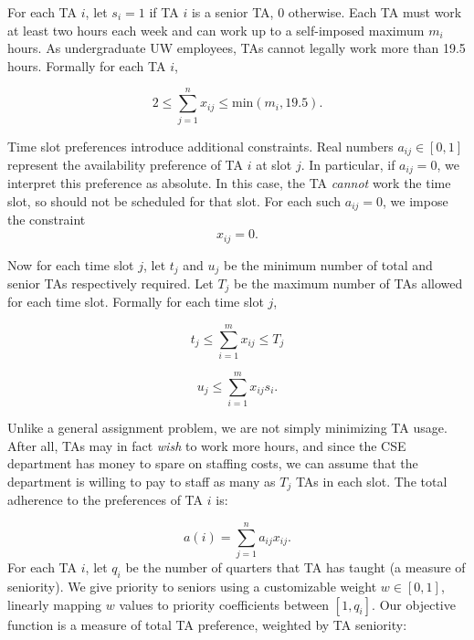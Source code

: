 \documentclass{article}
\begin{document}
\begin{multicols}{2}
For each TA $i$, let $s_i = 1$ if TA $i$ is a senior TA, 0 otherwise. Each TA must work at least two hours each week and can work up to a self-imposed maximum $m_i$ hours. As undergraduate UW employees, TAs cannot legally work more than 19.5 hours. Formally for each TA $i$,

\begin{equation}
2 \leq \sum_{j=1}^{n}x_{ij} \leq \textrm{min}(m_i, 19.5).
\end{equation}

Time slot preferences introduce additional constraints. Real numbers $a_{ij} \in [0,1]$ represent the availability preference of TA $i$ at slot $j$. In particular, if $a_{ij} = 0$, we interpret this preference as absolute. In this case, the TA \textit{cannot} work the time slot, so should not be scheduled for that slot. For each such $a_{ij} = 0$, we impose the constraint
\begin{equation}
x_{ij} = 0.
\end{equation}

Now for each time slot $j$, let $t_j$ and $u_j$ be the minimum number of total and senior TAs respectively required. Let $T_j$ be the maximum number of TAs allowed for each time slot. Formally for each time slot $j$,

\begin{equation}
t_j \leq \sum_{i=1}^{m}x_{ij} \leq T_j
\end{equation}

\begin{equation}
u_j \leq \sum_{i=1}^{m}x_{ij}s_i.
\end{equation}

Unlike a general assignment problem, we are not simply minimizing TA usage. After all, TAs may in fact \textit{wish} to work more hours, and since the CSE department has money to spare on staffing costs, we can assume that the department is willing to pay to staff as many as $T_j$ TAs in each slot. The total adherence to the preferences of TA $i$ is:

\begin{equation}
a(i) = \sum_{j=1}^na_{ij}x_{ij}.
\end{equation}
For each TA $i$, let $q_i$ be the number of quarters that TA has taught (a measure of seniority). We give priority to seniors using a customizable weight $w \in [0,1]$, linearly mapping $w$ values to priority coefficients between $[1, q_i]$. Our objective function is a measure of total TA preference, weighted by TA seniority:


\end{multicols}
\end{document}
